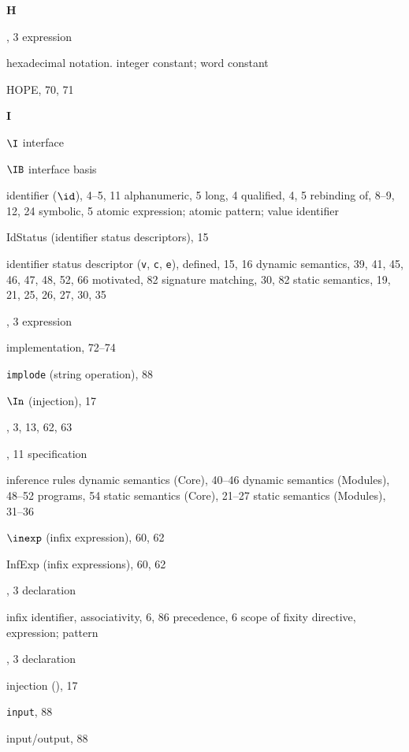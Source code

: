 \begin{theindex}
\indexspace
\parbox{64mm}{\hfil{\large\bf H}\hfil}
\indexspace
\item \HANDLE, 3
\subitem \seealso expression
\item hexadecimal notation. \see integer constant; word constant
\item HOPE, 70, 71
\indexspace
\parbox{64mm}{\hfil{\large\bf I}\hfil}
\indexspace
\item $\I$ \see interface
\item $\IB$ \see interface basis
\item identifier ($\id$), 4--5, 11
\subitem alphanumeric, 5
\subitem long, 4
\subitem qualified, 4, 5
\subitem rebinding of, 8--9, 12, 24
\subitem symbolic, 5
\subitem \seealso  atomic expression; atomic pattern; value identifier
\item IdStatus (identifier status descriptors), 15
\item identifier status descriptor ({\tt v}, {\tt c}, {\tt e}),
\subitem defined, 15, 16
\subitem dynamic semantics, 39, 41, 45, 46, 47, 48, 52, 66
\subitem motivated, 82
\subitem signature matching, 30, 82
\subitem static semantics, 19, 21, 25, 26, 27, 30, 35
\item \IF, 3
\subitem \seealso expression
\item implementation, 72--74
\item {\tt implode} (string operation), 88
\item $\In$ (injection), 17
\item \IN, 3, 13, 62, 63
\item \INCLUDE, 11
\subitem \seealso specification
\item inference rules
\subitem dynamic semantics (Core), 40--46
\subitem dynamic semantics (Modules), 48--52
\subitem programs, 54
\subitem static semantics (Core), 21--27
\subitem static semantics (Modules), 31--36
\item $\inexp$ (infix expression), 60, 62
\item InfExp (infix expressions), 60, 62
\item \INFIX, 3
\subitem \seealso declaration
\item infix identifier, \infixapplrefs
\subitem associativity, 6, 86
\subitem precedence, 6
\subitem scope of fixity directive, \scopefixityrefs
\subitem \seealso expression; pattern
\item \INFIXR, 3
\subitem \seealso declaration
\item injection (\In), 17
\item {\tt input}, 88
\item input/output, 88

\end{theindex}

